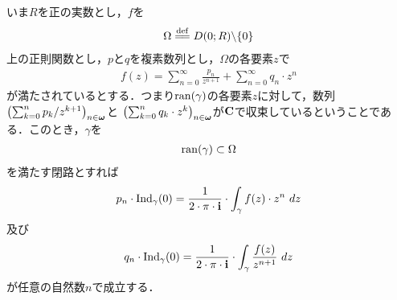 	いま$R$を正の実数とし，$f$を
	\begin{align}
		\Omega \defeq \disc{0}{R} \backslash \{0\}
	\end{align}
	上の正則関数とし，$p$と$q$を複素数列とし，$\Omega$の各要素$z$で
	\begin{align}
		f(z) = \sum_{n=0}^{\infty} \frac{p_{n}}{z^{n+1}} + \sum_{n=0}^{\infty} q_{n} \cdot z^{n}
	\end{align}
	が満たされているとする．つまり$\operatorname*{ran} (\gamma)$の各要素$z$に対して，数列$\left(\sum_{k=0}^{n} p_{k}/z^{k+1}\right)_{n \in {\boldsymbol \omega}}$と
	$\left(\sum_{k=0}^{n} q_{k} \cdot z^{k}\right)_{n \in {\boldsymbol \omega}}$が$\mathbf{C}$で収束しているということである．このとき，$\gamma$を
	\begin{align}
		\operatorname*{ran} (\gamma) \subset \Omega
	\end{align}
	を満たす閉路とすれば
	\begin{align}
		p_{n} \cdot \operatorname{Ind}_{\gamma}(0) = \frac{1}{2\cdot\pi\cdot\mathbf{i}} \cdot \int_{\gamma} f(z) \cdot z^{n}\ dz
		\label{fom:Laurent_series_0_1}
	\end{align}
	及び
	\begin{align}
		q_{n} \cdot \operatorname{Ind}_{\gamma}(0) = \frac{1}{2\cdot\pi\cdot\mathbf{i}} \cdot \int_{\gamma} \frac{f(z)}{z^{n+1}}\ dz
		\label{fom:Laurent_series_0_2}
	\end{align}
	が任意の自然数$n$で成立する．
	
